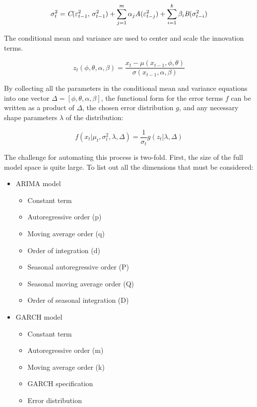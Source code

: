 \documentclass[12pt]{article}
\begin{document}
\begin{equation}
    \sigma^{2}_{t} = \emph{C}(\varepsilon^{2}_{t-1}, \, \sigma^{2}_{t-1}) + \sum_{j=1}^{m} \alpha_{j} \emph{A}(\varepsilon^{2}_{t - j}) + \sum_{i=1}^{k} \beta_{i} \emph{B}(\sigma^{2}_{t - i})
\end{equation}

The conditional mean and variance are used to center and scale the innovation terms.

\begin{equation}
    z_{t}(\phi, \theta, \alpha, \beta) = \frac{x_{t} - \mu(x_{t-1}, \phi, \theta)}{\sigma(x_{t-1}, \alpha, \beta)}
\end{equation}

By collecting all the parameters in the conditional mean and variance equations into one vector $\Delta = [\phi, \theta, \alpha, \beta]$, the functional form for the error terms $f$ can be written as a product of $\Delta$, the chosen error distribution $g$, and any necessary shape parameters $\lambda$ of the distribution:

\begin{equation}
    f(x_{t} | \mu_{t}, \sigma^{2}_{t}, \lambda, \Delta) = \frac{1}{\sigma_{t}} g(z_{t} | \lambda, \Delta)
\end{equation}

The challenge for automating this process is two-fold. First, the size of the full model space is quite large. To list out all the dimensions that must be considered:

\begin{itemize}
    \item ARIMA model
        \begin{itemize}
            \item Constant term
            \item Autoregressive order (p)
            \item Moving average order (q)
            \item Order of integration (d)
            \item Seasonal autoregressive order (P)
            \item Seasonal moving average order (Q)
            \item Order of seasonal integration (D)
        \end{itemize}
        \item GARCH model
        \begin{itemize}
            \item Constant term
            \item Autoregressive order (m)
            \item Moving average order (k)
            \item GARCH specification
            \item Error distribution
        \end{itemize}

\end{itemize}
\end{document}
